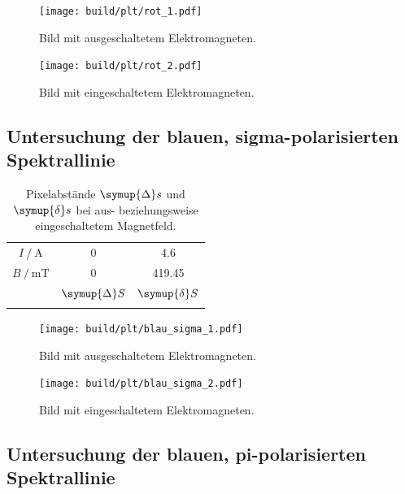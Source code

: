 \begin{figure}
    \centering
    \texttt{[image: build/plt/rot\_1.pdf]}
    \caption{Bild mit ausgeschaltetem Elektromagneten.}
    \label{fig:plt:rot_1}
\end{figure}

\begin{figure}
    \centering
    \texttt{[image: build/plt/rot\_2.pdf]}
    \caption{Bild mit eingeschaltetem Elektromagneten.}
    \label{fig:plt:rot_2}
\end{figure}


\FloatBarrier
\subsection{Untersuchung der blauen, sigma-polarisierten Spektrallinie}

\begin{table}
    \centering
    \caption{Pixelabstände $\symup{\Delta} s$ und $\symup{\delta} s$ bei aus- beziehungsweise eingeschaltetem Magnetfeld.}
    \label{tab:blau_sigma}
    \begin{tabular}{S S S}
        \toprule
        {$I \mathbin{/} \si{\ampere}$} & 0 & 4.6 \\
        {$B \mathbin{/} \si{\milli\tesla}$} & 0 & 419.45  \\
        \midrule
        & {$\symup{\Delta} S$} & {$\symup{\delta} S$} \\
        \midrule
        \bottomrule
    \end{tabular}
\end{table}

\begin{figure}
    \centering
    \texttt{[image: build/plt/blau\_sigma\_1.pdf]}
    \caption{Bild mit ausgeschaltetem Elektromagneten.}
    \label{fig:plt:blau_sigma_1}
\end{figure}

\begin{figure}
    \centering
    \texttt{[image: build/plt/blau\_sigma\_2.pdf]}
    \caption{Bild mit eingeschaltetem Elektromagneten.}
    \label{fig:plt:blau_sigma_2}
\end{figure}


\FloatBarrier
\subsection{Untersuchung der blauen, pi-polarisierten Spektrallinie}

